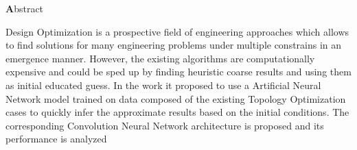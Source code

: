 
\clearemptydoublepage
{}
{}

\vspace*{2cm}
\begin{center}
{\Large \textbf Abstract}
\end{center}
\vspace{1cm}

Design Optimization is a prospective field of engineering approaches which allows to find solutions for many engineering problems under multiple constrains in an emergence manner.
However, the existing algorithms are computationally expensive and could be sped up by finding heuristic coarse results and using them as initial educated guess.
In the work it proposed to use a Artificial Neural Network model trained on data composed of the existing Topology Optimization cases to quickly infer the approximate results based on the initial conditions. The corresponding Convolution Neural Network architecture is proposed and its performance is analyzed

